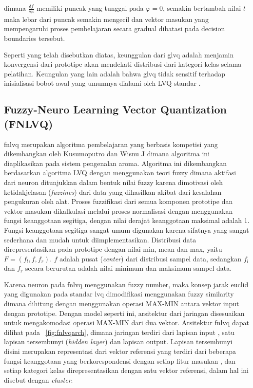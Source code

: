 \noindent dimana $\frac{\delta f}{\delta \varphi}$ memiliki puncak yang
tunggal pada $\varphi=0$, semakin bertambah nilai $t$ maka lebar dari puncak
semakin mengecil dan vektor masukan yang mempengaruhi proses pembelajaran secara
gradual dibatasi pada decision boundaries tersebut.
 
Seperti yang telah disebutkan diatas, keunggulan dari \gls{glvq} adalah menjamin
konvergensi dari prototipe akan mendekati distribusi dari kategori kelas selama
pelatihan. Keungulan yang lain adalah bahwa \gls{glvq} tidak sensitif terhadap
inisialisasi bobot awal yang umumnya dialami oleh LVQ standar \cite{Sato:1999}. 

 
\subsection{Fuzzy-Neuro Learning Vector Quantization (FNLVQ)}

\Gls{fnlvq} merupakan algoritma pembelajaran yang berbasis kompetisi yang
dikembangkan oleh Kusumoputro dan Wisnu J \cite{Kusumoputro:2002} dimana
algoritma ini diaplikasikan pada sistem pengenalan aroma.  Algoritma ini dikembangkan
berdasarkan algoritma LVQ dengan menggunakan teori fuzzy dimana aktifasi
dari neuron ditunjukkan dalam bentuk nilai fuzzy karena dimotivasi
oleh ketidakjelasan (\emph{fuzzines}) dari data yang dihasilkan akibat dari
kesalahan pengukuran oleh alat. Proses fuzzifikasi dari semua komponen prototipe
dan vektor masukan dikalkulasi melalui proses normalisasi dengan menggunakan
fungsi keanggotaan segitiga, dengan nilai derajat keanggotaan maksimal adalah 1.
Fungsi keanggotaan segitiga sangat umum digunakan karena sifatnya yang sangat
sederhana dan mudah untuk diimplementasikan. Distribusi data direpresentasikan
pada prototipe dengan nilai min, mean dan max, yaitu $F = (f_l, f, f_r)$. $f$
adalah pusat (\emph{center}) dari distribusi sampel data, sedangkan $f_l$ dan
$f_r$ secara berurutan adalah nilai minimum dan maksimum sampel data. 

Karena neuron pada \gls{fnlvq} menggunakan fuzzy number, maka konsep jarak
euclid yang digunakan pada standar \gls{lvq} dimodifikasi menggunakan fuzzy
similarity dimana dihitung dengan menggunakan operasi MAX-MIN antara vektor
input dengan prototipe. Dengan model seperti ini, arsitektur dari jaringan
disesuaikan untuk mengakomodasi operasi MAX-MIN dari dua vektor. Arsitektur
\gls{fnlvq} dapat dilihat pada \pic~\ref{fig:fnlvqarch}, dimana jaringan terdiri
dari lapisan input , satu lapisan tersembunyi (\emph{hidden layer}) dan lapisan
output. Lapisan tersembunyi disini merupakan representasi dari vektor referensi
yang terdiri dari beberapa fungsi keanggotaan yang berkorespondensi dengan
setiap fitur masukan , dan setiap kategori  kelas direpresentasikan dengan satu
vektor referensi, dalam hal ini disebut dengan \emph{cluster}.

